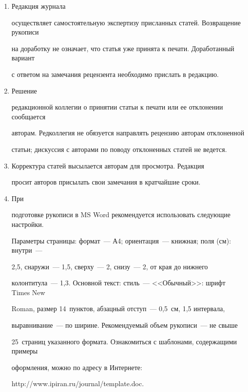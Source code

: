 {{\begin{enumerate}
почтовый адрес. Если работа выполнена несколькими авторами, указывается фамилия


одного из них, ответственного за переписку с редакцией. %


\item Редакция журнала


осуществляет самостоятельную экспертизу присланных статей. Возвращение рукописи


на доработку не означает, что статья уже принята к печати. Доработанный вариант


с ответом на замечания рецензента необходимо прислать в редакцию. %


\item Решение


редакционной коллегии о принятии статьи к печати или ее отклонении сообщается


авторам. Редколлегия не обязуется направлять рецензию авторам отклоненной


статьи; дискуссия с авторами по поводу отклоненных статей не ведется. %


\item Корректура статей высылается авторам для просмотра. Редакция


просит авторов присылать свои замечания в кратчайшие сроки. %


\item При


подготовке рукописи в MS Word рекомендуется использовать следующие настройки.


Параметры страницы: формат~--- А4; ориентация~--- книжная; поля (см): внутри~---


2,5, снаружи~--- 1,5, сверху~--- 2, снизу~--- 2, от края до нижнего


колонтитула~--- 1,3. Основной текст: стиль~--- <<Обычный>>: шрифт Times New


Roman, размер 14~пунктов, абзацный отступ~--- 0,5~см, 1,5 интервала,


выравнивание~--- по ширине. Рекомендуемый объем рукописи~--- не свыше


25~страниц указанного формата. Ознакомиться с шаблонами, содержащими примеры


оформления, можно по адресу в Интернете:


\textsf{http://www.ipiran.ru/journal/template.doc}.



\end{enumerate}}}
